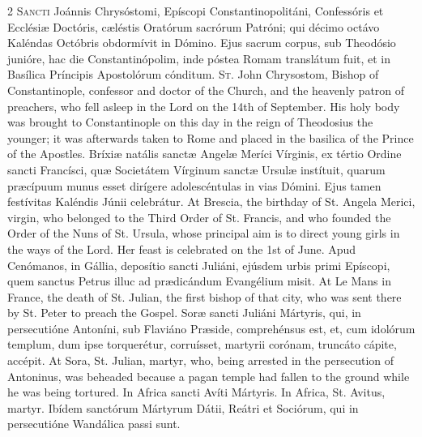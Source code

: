 \begin{paracol}{2}
\lettrine[lines=2]{S}{ancti} Joánnis Chrysóstomi, Epíscopi Constantinopolitáni, Confessóris et 
 Ecclésiæ Doctóris, cæléstis Oratórum sacrórum 
 Patróni; qui décimo octávo Kaléndas Octóbris obdormívit in Dómino. 
 Ejus sacrum corpus, sub Theodósio junióre, hac die Constantinópolim, inde 
 póstea Romam translátum fuit, et in Basílica Príncipis Apostolórum cónditum.
\switchcolumn
{}
\lettrine[lines=2]{S}{t.} John Chrysostom, Bishop of Constantinople, confessor and doctor of the 
 Church, and the heavenly patron of preachers, who fell asleep in the Lord on 
 the 14th of September. His holy body was brought to Constantinople on 
 this day in the reign of Theodosius the younger; it was afterwards taken to 
 Rome and placed in the basilica of the Prince of the Apostles.
\switchcolumn*
{}
Bríxiæ natális sanctæ Angelæ Meríci Vírginis, 
 ex tértio Ordine sancti Francísci, quæ Societátem Vírginum sanctæ Ursulæ 
 instítuit, quarum præcípuum munus esset dirígere adolescéntulas in vias 
 Dómini. Ejus tamen festívitas 
 Kaléndis Júnii celebrátur.
\switchcolumn
{}
At Brescia, the birthday of St. Angela Merici, virgin, who belonged to the 
 Third Order of St. Francis, and who founded the Order of the Nuns of St. 
 Ursula, whose principal aim is to direct young girls in the ways of the 
 Lord. Her feast is celebrated on the 1st 
 of June.
\switchcolumn*
{}
Apud Cenómanos, in Gállia, deposítio sancti 
 Juliáni, ejúsdem urbis primi Epíscopi, quem sanctus Petrus illuc ad 
 prædicándum Evangélium misit.
\switchcolumn
{}
At Le Mans in France, the death of St. Julian, the first bishop of that 
 city, who was sent there by St. Peter to preach the Gospel.
\switchcolumn*
{}
Soræ sancti Juliáni Mártyris, qui, in 
 persecutióne Antoníni, sub Flaviáno Præside, comprehénsus est, et, cum 
 idolórum templum, dum ipse torquerétur, corruísset, martyrii corónam, 
 truncáto cápite, accépit.
\switchcolumn
{}
At Sora, St. Julian, martyr, who, being arrested in the persecution of 
 Antoninus, was beheaded because a pagan temple had fallen to the ground 
 while he was being tortured.
\switchcolumn*
{}
In Africa sancti Avíti Mártyris.
\switchcolumn
{}
In Africa, St. Avitus, martyr.
\switchcolumn*
{}
Ibídem sanctórum Mártyrum Dátii, Reátri et Sociórum, qui in persecutióne 
 Wandálica passi sunt.
\switchcolumn

\end{paracol}

